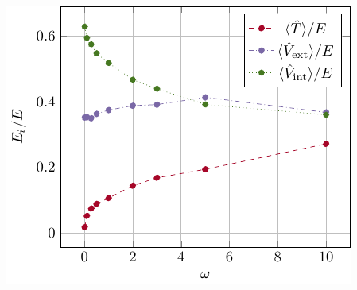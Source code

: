\documentclass[%
oneside,                 %
final,                   %
10pt]{article}
\begin{document}
\begin{block}{}

\vspace{6mm}

\centerline{\includegraphics[width=0.9\linewidth]{figures/virialtheorem.pdf}}

\vspace{6mm}

\end{block}



\end{document}

